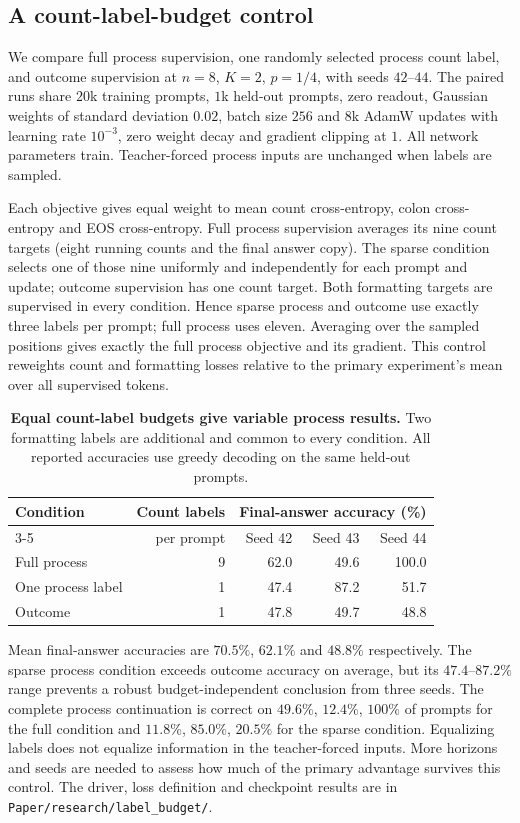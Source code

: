 \subsection{A count-label-budget control}
\label{app:label-budget}
We compare full process supervision, one randomly selected process count label,
and outcome supervision at $n=8$, $K=2$, $p=1/4$, with seeds $42$--$44$.
The paired runs share $20$k training prompts, $1$k held-out prompts, zero readout,
Gaussian weights of standard deviation $0.02$, batch size $256$ and $8$k AdamW
updates with learning rate $10^{-3}$, zero weight decay and gradient clipping at $1$.
All network parameters train. Teacher-forced process inputs are unchanged when labels are sampled.

Each objective gives equal weight to mean count cross-entropy, colon cross-entropy
and EOS cross-entropy. Full process supervision averages its nine count targets
(eight running counts and the final answer copy). The sparse condition selects one
of those nine uniformly and independently for each prompt and update; outcome
supervision has one count target. Both formatting targets are supervised in every
condition. Hence sparse process and outcome use exactly three labels per prompt;
full process uses eleven. Averaging over the sampled positions gives exactly the
full process objective and its gradient. This control reweights count and formatting
losses relative to the primary experiment's mean over all supervised tokens.

\begin{table}[H]
\centering\small
\begin{tabular}{@{}lrrrr@{}}
\toprule
Condition & Count labels & \multicolumn{3}{c}{Final-answer accuracy (\%)}\\
\cmidrule(l){3-5}
 & per prompt & Seed 42 & Seed 43 & Seed 44\\
\midrule
Full process & 9 & 62.0 & 49.6 & 100.0\\
One process label & 1 & 47.4 & 87.2 & 51.7\\
Outcome & 1 & 47.8 & 49.7 & 48.8\\
\bottomrule
\end{tabular}
\caption{\textbf{Equal count-label budgets give variable process results.}
Two formatting labels are additional and common to every condition.
All reported accuracies use greedy decoding on the same held-out prompts.}
\label{tab:label-budget}
\end{table}
Mean final-answer accuracies are $70.5\%$, $62.1\%$ and $48.8\%$ respectively.
The sparse process condition exceeds outcome accuracy on average, but its
$47.4$--$87.2\%$ range prevents a robust budget-independent conclusion from three seeds.
The complete process continuation is correct on $49.6\%$, $12.4\%$, $100\%$ of
prompts for the full condition and $11.8\%$, $85.0\%$, $20.5\%$ for the sparse condition.
Equalizing labels does not equalize information in the teacher-forced inputs.
More horizons and seeds are needed to assess how much of the primary advantage
survives this control. The driver, loss definition and checkpoint results are in
\nolinkurl{Paper/research/label_budget/}.

